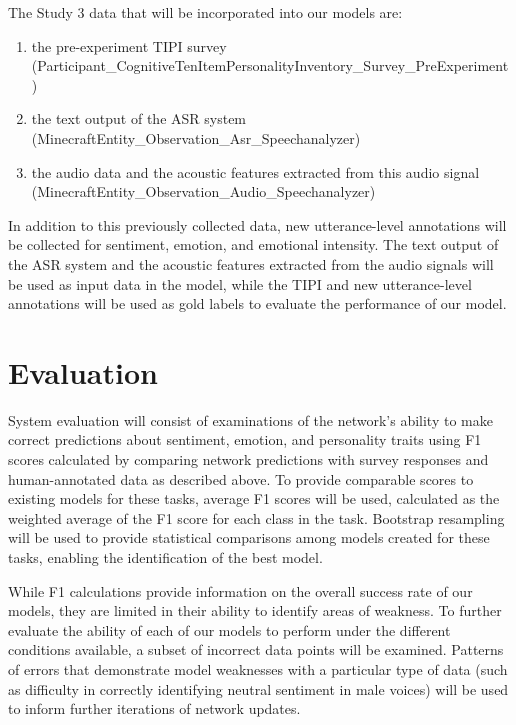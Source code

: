 The Study 3 data that will be incorporated into our models are:

\begin{enumerate}
    \item the
pre-experiment TIPI survey \\
(Participant\_CognitiveTenItemPersonalityInventory\_Survey\_PreExperiment)
    \item the
text output of the ASR system \\
(MinecraftEntity\_Observation\_Asr\_Speechanalyzer)
    \item the audio data and the
acoustic features extracted from this audio signal
(MinecraftEntity\_Observation\_Audio\_Speechanalyzer)
\end{enumerate}

In addition to this previously collected data, new
utterance-level annotations will be collected for sentiment, emotion, and
emotional intensity. The text output of the ASR system and the acoustic features
extracted from the audio signals will be used as input data in the model,
while the TIPI and new utterance-level annotations will be used as gold labels
to evaluate the performance of our model.

\section{Evaluation}

System evaluation will consist of examinations of the network's ability to make
correct predictions about sentiment, emotion, and personality traits using F1
scores calculated by comparing network predictions with survey responses and
human-annotated data as described above. To provide comparable scores to
existing models for these tasks, average F1 scores will be used, calculated as
the weighted average of the F1 score for each class in the task.  Bootstrap
resampling \cite{kohavi1995study} will be used to provide statistical
comparisons among models created for these tasks, enabling the identification
of the best model.

While F1 calculations provide information on the overall success rate of our
models, they are limited in their ability to identify areas of weakness. To
further evaluate the ability of each of our models to perform under the different
conditions available, a subset of incorrect data points will be examined.
Patterns of errors that demonstrate model weaknesses with a particular type of
data (such as difficulty in correctly identifying neutral sentiment in male
voices) will be used to inform further iterations of network updates.

